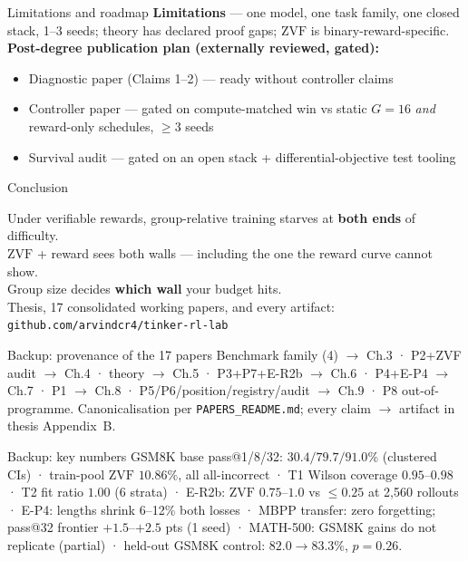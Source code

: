 \documentclass[11pt,aspectratio=169]{beamer}
\newcommand{\ZVF}{\ensuremath{\mathrm{ZVF}}}
\begin{document}
\begin{frame}{Limitations and roadmap}
\textbf{Limitations} — one model, one task family, one closed stack,
1–3 seeds; theory has declared proof gaps; \ZVF{} is binary-reward-specific.
\\[8pt]
\textbf{Post-degree publication plan (externally reviewed, gated):}
\begin{itemize}
  \item Diagnostic paper (Claims 1–2) — ready without controller claims
  \item Controller paper — gated on compute-matched win vs static $G{=}16$
        \emph{and} reward-only schedules, $\ge3$ seeds
  \item Survival audit — gated on an open stack + differential-objective
        test tooling
\end{itemize}
\end{frame}

\begin{frame}{Conclusion}
\begin{center}
\Large Under verifiable rewards, group-relative training starves at
\textbf{both ends} of difficulty.\\[10pt]
\ZVF{} + reward sees both walls — including the one the reward curve
cannot show.\\[10pt]
Group size decides \textbf{which wall} your budget hits.\\[14pt]
\normalsize Thesis, 17 consolidated working papers, and every artifact:
\texttt{github.com/arvindcr4/tinker-rl-lab}
\end{center}
\end{frame}

\appendix
\begin{frame}{Backup: provenance of the 17 papers}
Benchmark family (4) $\to$ Ch.3 · P2+ZVF audit $\to$ Ch.4 · theory $\to$ Ch.5
· P3+P7+E-R2b $\to$ Ch.6 · P4+E-P4 $\to$ Ch.7 · P1 $\to$ Ch.8 ·
P5/P6/position/registry/audit $\to$ Ch.9 · P8 out-of-programme.
Canonicalisation per \texttt{PAPERS\_README.md}; every claim $\to$ artifact
in thesis Appendix~B.
\end{frame}

\begin{frame}{Backup: key numbers}
\small
GSM8K base pass@1/8/32: $30.4/79.7/91.0\%$ (clustered CIs) ·
train-pool \ZVF{} $10.86\%$, all all-incorrect ·
T1 Wilson coverage $0.95$–$0.98$ ·
T2 fit ratio $1.00$ (6 strata) ·
E-R2b: $\ZVF$ $0.75$–$1.0$ vs $\le0.25$ at 2{,}560 rollouts ·
E-P4: lengths shrink 6–12\% both losses ·
MBPP transfer: zero forgetting; pass@32 frontier $+1.5$–$+2.5$ pts (1 seed) ·
MATH-500: GSM8K gains do not replicate (partial) ·
held-out GSM8K control: $82.0\to83.3\%$, $p{=}0.26$.
\end{frame}
\end{document}
